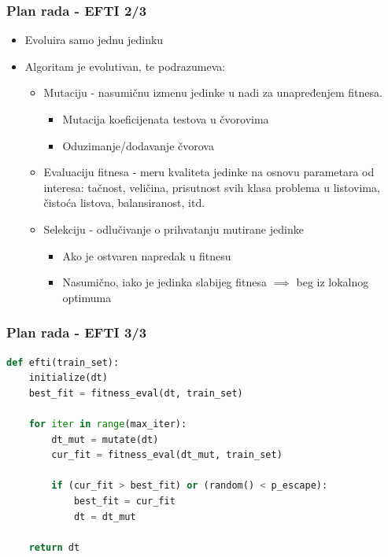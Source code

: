 \documentclass{beamer}
\begin{document}
\begin{frame}
\frametitle{Plan rada - EFTI 2/3}
\begin{itemize}
\setlength{\itemsep}{\fill}
\item Evoluira samo jednu jedinku
\item Algoritam je evolutivan, te podrazumeva:
\begin{itemize}
\setlength{\itemsep}{\fill}
\item Mutaciju - nasumičnu izmenu jedinke u nadi za unapređenjem fitnesa.
\begin{itemize}
\item Mutacija koeficijenata testova u čvorovima
\item Oduzimanje/dodavanje čvorova
\end{itemize}
\item Evaluaciju fitnesa - meru kvaliteta jedinke na osnovu parametara od interesa: tačnost, veličina, prisutnost svih klasa problema u listovima, čistoća listova, balansiranost, itd.
\item Selekciju - odlučivanje o prihvatanju mutirane jedinke
\begin{itemize}
\item Ako je ostvaren napredak u fitnesu
\item Nasumično, iako je jedinka slabijeg fitnesa $\implies$ beg iz lokalnog optimuma
\end{itemize}
\end{itemize}
\end{itemize}
\end{frame}


\begin{frame}[fragile]
\frametitle{Plan rada - EFTI 3/3}
\small\begin{lstlisting}[language=Python]
def efti(train_set):
    initialize(dt)
    best_fit = fitness_eval(dt, train_set)

    for iter in range(max_iter):
        dt_mut = mutate(dt)
        cur_fit = fitness_eval(dt_mut, train_set)

        if (cur_fit > best_fit) or (random() < p_escape):
            best_fit = cur_fit
            dt = dt_mut

    return dt
\end{lstlisting}
\end{frame}

\end{document}
